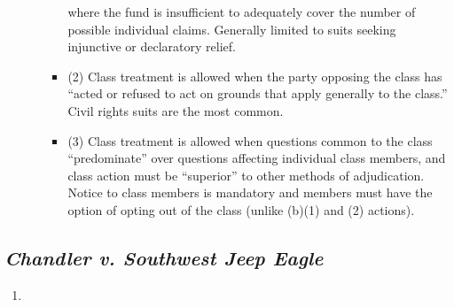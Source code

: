 \begin{enumerate}
\begin{itemize}
\begin{itemize}
            where the fund is insufficient to adequately cover the number of
            possible individual claims. Generally limited to suits seeking
            injunctive or declaratory relief.
            \item (2) Class treatment is allowed when the party opposing the
            class has ``acted or refused to act on grounds that apply
            generally to the class.'' Civil rights suits are the most common.
            \item (3) Class treatment is allowed when questions common to the
            class ``predominate'' over questions affecting individual class
            members, and class action must be ``superior'' to other methods of
            adjudication. Notice to class members is mandatory and members
            must have the option of opting out of the class (unlike (b)(1) and
            (2) actions).
        \end{itemize}
    \end{itemize}
\end{enumerate}

\subsection{\emph{Chandler v. Southwest Jeep Eagle}}

\begin{enumerate}
    \item %
\end{enumerate}

